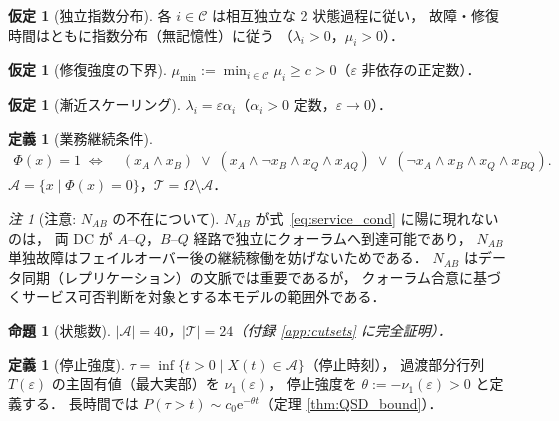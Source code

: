 \documentclass[12pt,a4paper]{article}
\theoremstyle{plain}
\newtheorem{proposition}[theorem]{命題}
\theoremstyle{definition}
\newtheorem{definition}[theorem]{定義}
\newtheorem{assumption}[theorem]{仮定}
\theoremstyle{remark}
\newtheorem{remark}[theorem]{注}
\newcommand{\calA}{\mathcal{A}}
\newcommand{\calT}{\mathcal{T}}
\newcommand{\calC}{\mathcal{C}}
\newcommand{\eps}{\varepsilon}
\newcommand{\e}{\mathrm{e}}
\begin{document}
\begin{assumption}[独立指数分布]\label{ass:indep}
  各 $i\in\calC$ は相互独立な 2 状態過程に従い，
  故障・修復時間はともに指数分布（無記憶性）に従う
  （$\lambda_i>0$，$\mu_i>0$）．
\end{assumption}

\begin{assumption}[修復強度の下界]\label{ass:mumin}
  $\mu_{\min}:=\min_{i\in\calC}\mu_i \ge c > 0$（$\eps$ 非依存の正定数）．
\end{assumption}

\begin{assumption}[漸近スケーリング]\label{ass:asym}
  $\lambda_i = \eps\alpha_i$（$\alpha_i>0$ 定数，$\eps\to 0$）．
\end{assumption}

\begin{definition}[業務継続条件]\label{def:service}
  \begin{align}
    \Phi(x) = 1
    \;\iff\;
    &(x_A \land x_B)
    \;\lor\; (x_A \land \lnot x_B \land x_Q \land x_{AQ})
    \;\lor\; (\lnot x_A \land x_B \land x_Q \land x_{BQ}).
    \label{eq:service_cond}
  \end{align}
  $\calA = \{x\mid\Phi(x)=0\}$，$\calT=\Omega\setminus\calA$．
\end{definition}

\begin{remark}[注意: $N_{AB}$ の不在について]
  $N_{AB}$ が式~\eqref{eq:service_cond} に陽に現れないのは，
  両 DC が $A$–$Q$，$B$–$Q$ 経路で独立にクォーラムへ到達可能であり，
  $N_{AB}$ 単独故障はフェイルオーバー後の継続稼働を妨げないためである．
  $N_{AB}$ はデータ同期（レプリケーション）の文脈では重要であるが，
  クォーラム合意に基づくサービス可否判断を対象とする本モデルの範囲外である．
\end{remark}

\begin{proposition}[状態数]\label{prop:states}
  $|\calA|=40$，$|\calT|=24$（付録 \ref{app:cutsets} に完全証明）．
\end{proposition}

\begin{definition}[停止強度]\label{def:theta}
  $\tau=\inf\{t>0\mid X(t)\in\calA\}$（停止時刻），
  過渡部分行列 $T(\eps)$ の主固有値（最大実部）を $\nu_1(\eps)$，
  停止強度を $\theta := -\nu_1(\eps) > 0$ と定義する．
  長時間では $P(\tau>t)\sim c_0\e^{-\theta t}$（定理 \ref{thm:QSD_bound}）．
\end{definition}
\end{document}
